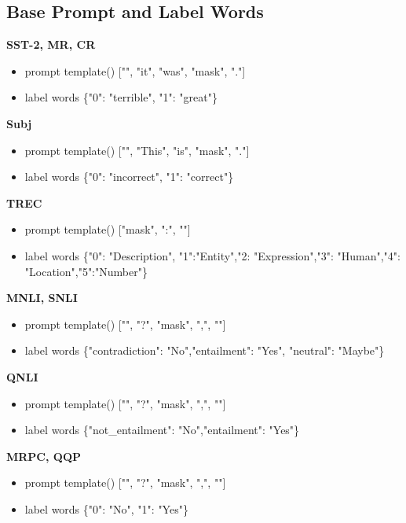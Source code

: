 \documentclass{article} \usepackage{iclr2022_conference,times}
\begin{document}
\subsection{Base Prompt and Label Words}

\textbf{SST-2, MR, CR}
\begin{itemize}
\item prompt template()
["", "it", "was", "mask", "."]
\item label words
\{"0": "terrible", "1": "great"\}
\end{itemize}

\textbf{Subj}
\begin{itemize}
\item prompt template()
["", "This", "is", "mask", "."]
\item label words
\{"0": "incorrect", "1": "correct"\}
\end{itemize}

\textbf{TREC}
\begin{itemize}
\item prompt template()
["mask", ":", ""]
\item label words
\{"0": "Description", "1":"Entity","2: "Expression","3": "Human","4": "Location","5":"Number"\}
\end{itemize}

\textbf{MNLI, SNLI}
\begin{itemize}
\item prompt template()
["", "?", "mask", ",", ""]
\item label words
\{"contradiction": "No","entailment": "Yes", "neutral": "Maybe"\}
\end{itemize}

\textbf{QNLI}
\begin{itemize}
\item prompt template()
["", "?", "mask", ",", ""]
\item label words
\{"not\_entailment": "No","entailment": "Yes"\}
\end{itemize}

\textbf{MRPC, QQP}
\begin{itemize}
\item prompt template()
["", "?", "mask", ",", ""]
\item label words
\{"0": "No", "1": "Yes"\}
\end{itemize}
\end{document}

